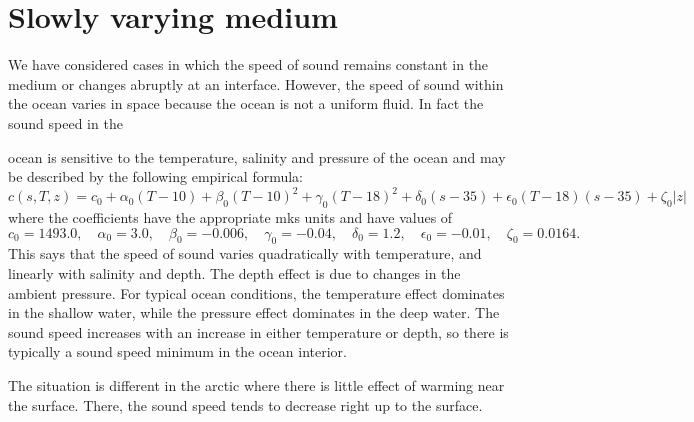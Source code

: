 \section{Slowly varying medium}

We have considered cases in which the speed of sound remains constant in the medium
or changes abruptly at an interface. However, the speed of sound within the ocean
varies in space because the ocean is not a uniform fluid. In fact the sound speed in the


ocean is sensitive to the temperature, salinity and pressure of the ocean and may be
described by the following empirical formula:
\[
	c(s,T,z)=c_0+\alpha_0(T-10)+\beta_0(T-10)^2+\gamma_0(T-18)^2
	+\delta_0(s-35)+\epsilon_0(T-18)(s-35)+\zeta_0|z|
\]
where the coefficients have the appropriate mks units and have values of
	{\small
		\[
			c_0=1493.0,\quad \alpha_0=3.0,\quad \beta_0=-0.006,\quad \gamma_0=-0.04,
			\quad \delta_0=1.2,\quad \epsilon_0=-0.01,\quad \zeta_0=0.0164.
		\]
	}
This says that the speed of sound varies quadratically with temperature, and linearly
with salinity and depth. The depth effect is due to changes in the ambient pressure.
For typical ocean conditions, the temperature effect dominates in the shallow water,
while the pressure effect dominates in the deep water. The sound speed increases with
an increase in either temperature or depth, so there is typically a sound speed
minimum in the ocean interior.


The situation is different in the arctic where there is little effect of warming near the
surface. There, the sound speed tends to decrease right up to the surface.

\sourcepagebreak


